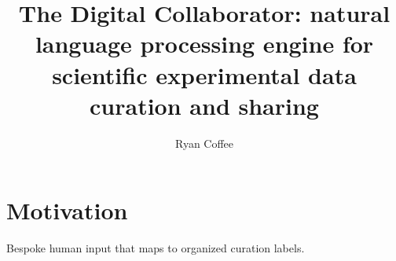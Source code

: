 \documentclass{article}
\title{The Digital Collaborator: natural language processing engine for scientific experimental data curation and sharing}
\author{Ryan Coffee}
\begin{document}
\maketitle
\section{Motivation}
Bespoke human input that maps to organized curation labels.
\end{document}
